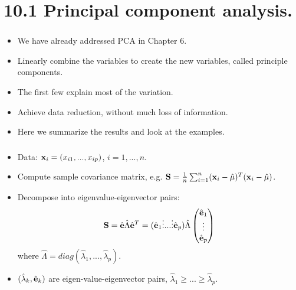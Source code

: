 \documentclass{beamer}
\def\bfx{{\bf x}}
\begin{document}
        	
        
\section{10.1 Principal component analysis.}    
    
       \begin{frame}
       	\frametitle{ }
       	\begin{itemize}
       		\item   We have already addressed PCA in Chapter 6.
       		
       		\item Linearly combine the variables to create the new variables, called principle components.
       		
       		\item The first few explain most of the variation. 
       		
       		\item Achieve data reduction, without much loss of information.
      
       		\item Here we summarize the results and look at the examples. 
       		
       		
       		
       	\end{itemize}
       	\end{frame}
       	
       	  \begin{frame}
       	  	\frametitle{ }
       	  	\begin{itemize}
       	  		\item Data: $\bfx_i = (x_{i1}, ..., x_{ip} ) $, $i=1,...,n$.
       	  \item  Compute sample covariance matrix, e.g.
       	  ${\bf S}=\frac{1}{n}\sum_{i=1}^n (\bfx_i - \hat\mu)^T (\bfx_i - \hat\mu)$.
       	  \item Decompose into eigenvalue-eigenvector pairs:
       	  $${\bf S} = \hat {\bf e} \hat \Lambda \hat {\bf e}^T =
       	   (\hat {\bf e}_1 \vdots ... \vdots \hat {\bf e}_p) \hat \Lambda 
       	   \begin{pmatrix}
       	   \hat {\bf e}_1  \\ \vdots  \\ \hat {\bf e}_p 
       	   \end{pmatrix}$$
       	   where $\hat \Lambda = diag(\hat \lambda_1, ..., \hat \lambda_p)$. 
       	   \item $(\hat \lambda_k, \hat{\bf e}_k)$ are eigen-value-eigenvector pairs, $\hat \lambda_1 \geq ...\geq \hat \lambda_p$.
       
       	   
       		 	\end{itemize}
       		 \end{frame} 
       		
\end{document}
